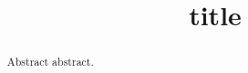 \documentclass{amsart}
\title{title}
\begin{document}
\begin{abstract}
Abstract abstract.
\end{abstract}
\maketitle
\end{document}
